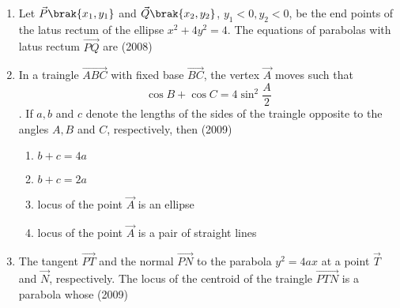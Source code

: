 \begin{enumerate}
\item Let $\vec{P}\brak{x_{1}, y_{1}}$ and $\vec{Q}\brak{x_{2},y_{2}}$, $y_{1}<0,y_{2}<0$, be the end points of the latus rectum of the ellipse $x^2+4y^2=4$. The equations of parabolas with latus rectum $\vec{PQ}$ are \hfill(2008)\\
	\begin{enumerate}
	\end{enumerate}

\item In a traingle $\vec{ABC}$ with fixed base $\vec{BC}$, the vertex $\vec{A}$ moves such that
	$$\cos{B}+\cos{C}=4\sin^2{\frac{A}{2}}$$.
		If $a,b$ and $c$ denote the lengths of the sides of the traingle opposite to the angles $A,B$ and $C$, respectively, then \hfill(2009)\\
		\begin{enumerate}
			\item $b+c=4a$
			\item $b+c=2a$
			\item locus of the point $\vec{A}$ is an ellipse
			\item locus of the point $\vec{A}$ is a pair of straight lines
		\end{enumerate}

	\item The tangent $\vec{PT}$ and the normal $\vec{PN}$ to the parabola $y^2=4ax$ at a point $\vec{T}$ and $\vec{N}$, respectively. The locus of the centroid of the traingle $\vec{PTN}$ is a parabola whose \hfill(2009)\\
		\begin{enumerate}
		\end{enumerate}


\end{enumerate}
